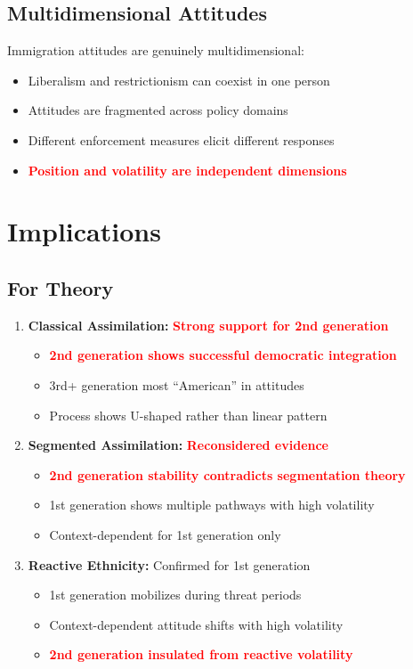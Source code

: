 \documentclass[11pt,letterpaper]{article}
\begin{document}
\subsection{Multidimensional Attitudes}

Immigration attitudes are genuinely multidimensional:
\begin{itemize}
    \item Liberalism and restrictionism can coexist in one person
    \item Attitudes are fragmented across policy domains
    \item Different enforcement measures elicit different responses
    \item \textcolor{red}{\textbf{Position and volatility are independent dimensions}}
\end{itemize}

\section{Implications}

\subsection{For Theory}
\begin{enumerate}
    \item \textbf{Classical Assimilation:} \textcolor{red}{\textbf{Strong support for 2nd generation}}
        \begin{itemize}
            \item \textcolor{red}{\textbf{2nd generation shows successful democratic integration}}
            \item 3rd+ generation most ``American'' in attitudes
            \item Process shows U-shaped rather than linear pattern
        \end{itemize}
    
    \item \textbf{Segmented Assimilation:} \textcolor{red}{\textbf{Reconsidered evidence}}
        \begin{itemize}
            \item \textcolor{red}{\textbf{2nd generation stability contradicts segmentation theory}}
            \item 1st generation shows multiple pathways with high volatility
            \item Context-dependent for 1st generation only
        \end{itemize}
    
    \item \textbf{Reactive Ethnicity:} Confirmed for 1st generation
        \begin{itemize}
            \item 1st generation mobilizes during threat periods
            \item Context-dependent attitude shifts with high volatility
            \item \textcolor{red}{\textbf{2nd generation insulated from reactive volatility}}
        \end{itemize}
\end{enumerate}
\end{document}
